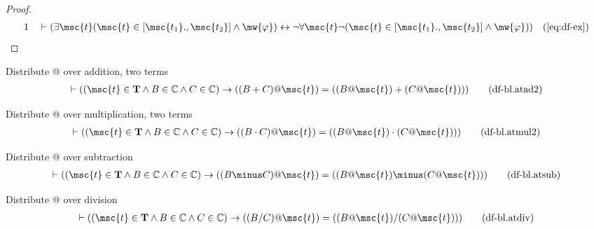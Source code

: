 \begin{proof}
\begin{align}
  1 &&  & \vdash ( \exists \msc{t} ( \msc{t} \in [ \msc{t_1} ., \msc{t_2} ] \wedge \mw{\varphi} ) \leftrightarrow \lnot \forall \msc{t} \lnot ( \msc{t} \in [ \msc{t_1} ., \msc{t_2} ] \wedge \mw{\varphi} ) )&(\mbox{\ref{eq:df-ex}})\notag
\end{align}
\end{proof}

\begin{metadefinition} Distribute @ over addition, two
terms
\begin{align}
\vdash ( ( \msc{t} \in \mathbf{T} \wedge B \in \mathbb{C} \wedge C \in
    \mathbb{C} ) \rightarrow ( ( B + C ) @ \msc{t} ) = ( ( B @ \msc{t} ) + ( C
    @ \msc{t} ) ) )\label{eq:df-bl.atad2}\tag{df-bl.atad2}
\end{align}
\end{metadefinition}

\begin{metadefinition} Distribute @ over multiplication,
two terms
\begin{align}
\vdash ( ( \msc{t} \in \mathbf{T} \wedge B \in \mathbb{C} \wedge C \in
    \mathbb{C} ) \rightarrow ( ( B \cdot C ) @ \msc{t} ) = ( ( B @ \msc{t} )
    \cdot ( C @ \msc{t} ) ) )\label{eq:df-bl.atmul2}\tag{df-bl.atmul2}
\end{align}
\end{metadefinition}

\begin{metadefinition} Distribute @ over subtraction
\begin{align}
\vdash ( ( \msc{t} \in \mathbf{T} \wedge B \in \mathbb{C} \wedge C \in
    \mathbb{C} ) \rightarrow ( ( B \minus C ) @ \msc{t} ) = ( ( B @ \msc{t} )
    \minus ( C @ \msc{t} ) ) )\label{eq:df-bl.atsub}\tag{df-bl.atsub}
\end{align}
\end{metadefinition}

\begin{metadefinition} Distribute @ over division
\begin{align}
\vdash ( ( \msc{t} \in \mathbf{T} \wedge B \in \mathbb{C} \wedge C \in
    \mathbb{C} ) \rightarrow ( ( B / C ) @ \msc{t} ) = ( ( B @ \msc{t} ) / ( C
    @ \msc{t} ) ) )\label{eq:df-bl.atdiv}\tag{df-bl.atdiv}
\end{align}
\end{metadefinition}

